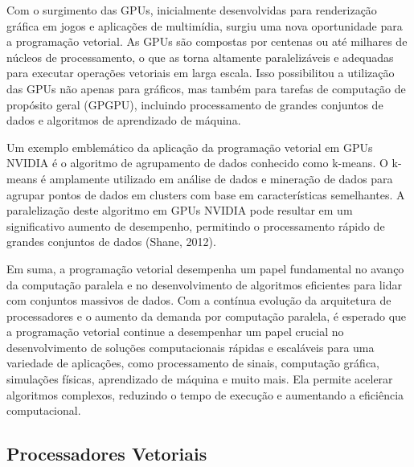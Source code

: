 \documentclass[12pt, %
openright, 
oneside, %
a4paper,    %
brazil]{facom-ufu-abntex2}
\begin{document}
Com o surgimento das GPUs, inicialmente desenvolvidas para renderização gráfica em jogos e aplicações de multimídia, surgiu uma nova oportunidade para a programação vetorial. As GPUs são compostas por centenas ou até milhares de núcleos de processamento, o que as torna altamente paralelizáveis e adequadas para executar operações vetoriais em larga escala. Isso possibilitou a utilização das GPUs não apenas para gráficos, mas também para tarefas de computação de propósito geral (GPGPU), incluindo processamento de grandes conjuntos de dados e algoritmos de aprendizado de máquina.

Um exemplo emblemático da aplicação da programação vetorial em GPUs NVIDIA é o algoritmo de agrupamento de dados conhecido como k-means. O k-means é amplamente utilizado em análise de dados e mineração de dados para agrupar pontos de dados em clusters com base em características semelhantes. A paralelização deste algoritmo em GPUs NVIDIA pode resultar em um significativo aumento de desempenho, permitindo o processamento rápido de grandes conjuntos de dados (Shane, 2012).

Em suma, a programação vetorial desempenha um papel fundamental no avanço da computação paralela e no desenvolvimento de algoritmos eficientes para lidar com conjuntos massivos de dados. Com a contínua evolução da arquitetura de processadores e o aumento da demanda por computação paralela, é esperado que a programação vetorial continue a desempenhar um papel crucial no desenvolvimento de soluções computacionais rápidas e escaláveis para uma variedade de aplicações, como processamento de sinais, computação gráfica, simulações físicas, aprendizado de máquina e muito mais. Ela permite acelerar algoritmos complexos, reduzindo o tempo de execução e aumentando a eficiência computacional.






\subsection{Processadores Vetoriais}
\end{document}
